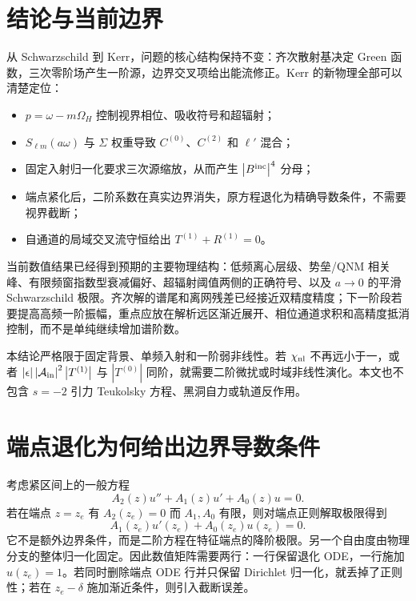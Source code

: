 \documentclass[UTF8,a4paper,11pt]{ctexart}
\newcommand{\abs}[1]{\left|#1\right|}
\begin{document}
\section{结论与当前边界}

从 Schwarzschild 到 Kerr，问题的核心结构保持不变：齐次散射基决定 Green 函数，三次零阶场产生一阶源，边界交叉项给出能流修正。Kerr 的新物理全部可以清楚定位：
\begin{itemize}
\item $p=\omega-m\Omega_H$ 控制视界相位、吸收符号和超辐射；
\item $S_{\ell m}(a\omega)$ 与 $\Sigma$ 权重导致 $C^{(0)}$、$C^{(2)}$ 和 $\ell'$ 混合；
\item 固定入射归一化要求三次源缩放，从而产生 $\abs{B^{\rm inc}}^4$ 分母；
\item 端点紧化后，二阶系数在真实边界消失，原方程退化为精确导数条件，不需要视界截断；
\item 自通道的局域交叉流守恒给出 $T^{(1)}+R^{(1)}=0$。
\end{itemize}

当前数值结果已经得到预期的主要物理结构：低频离心层级、势垒/QNM 相关峰、有限频窗指数型衰减偏好、超辐射阈值两侧的正确符号、以及 $a\to0$ 的平滑 Schwarzschild 极限。齐次解的谱尾和离网残差已经接近双精度精度；下一阶段若要提高高频一阶振幅，重点应放在解析远区渐近展开、相位通道求积和高精度抵消控制，而不是单纯继续增加谱阶数。

本结论严格限于固定背景、单频入射和一阶弱非线性。若 $\chi_{\rm nl}$ 不再远小于一，或者 $\abs{\epsilon}\abs{\mathcal A_{\rm in}}^2\abs{T^{(1)}}$ 与 $\abs{T^{(0)}}$ 同阶，就需要二阶微扰或时域非线性演化。本文也不包含 $s=-2$ 引力 Teukolsky 方程、黑洞自力或轨道反作用。

\appendix

\section{端点退化为何给出边界导数条件}

考虑紧区间上的一般方程
\begin{equation}
A_2(z)u''+A_1(z)u'+A_0(z)u=0.
\end{equation}
若在端点 $z=z_e$ 有 $A_2(z_e)=0$ 而 $A_1,A_0$ 有限，则对端点正则解取极限得到
\begin{equation}
A_1(z_e)u'(z_e)+A_0(z_e)u(z_e)=0.
\end{equation}
它不是额外边界条件，而是二阶方程在特征端点的降阶极限。另一个自由度由物理分支的整体归一化固定。因此数值矩阵需要两行：一行保留退化 ODE，一行施加 $u(z_e)=1$。若同时删除端点 ODE 行并只保留 Dirichlet 归一化，就丢掉了正则性；若在 $z_e-\delta$ 施加渐近条件，则引入截断误差。
\end{document}
